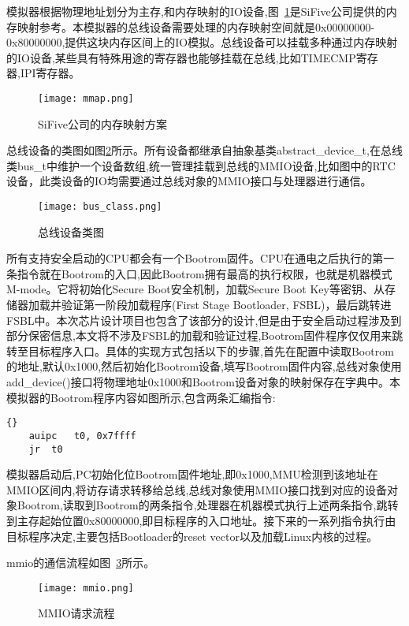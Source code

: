 模拟器根据物理地址划分为主存,和内存映射的IO设备,图~\ref{fig:mmap}是SiFive公司提供的内存映射参考。本模拟器的总线设备需要处理的内存映射空间就是0x00000000-0x80000000,提供这块内存区间上的IO模拟。总线设备可以挂载多种通过内存映射的IO设备,某些具有特殊用途的寄存器也能够挂载在总线,比如TIMECMP寄存器,IPI寄存器。
\begin{figure}[H]
    \centering
    \texttt{[image: mmap.png]}
    \caption{SiFive公司的内存映射方案}
    \label{fig:mmap}
\end{figure}


总线设备的类图如图\ref{fig:bus_class}所示。所有设备都继承自抽象基类abstract\_device\_t,在总线类bus\_t中维护一个设备数组,统一管理挂载到总线的MMIO设备,比如图中的RTC设备，此类设备的IO均需要通过总线对象的MMIO接口与处理器进行通信。
\begin{figure}[H]
    \centering
    \texttt{[image: bus\_class.png]}
    \caption{总线设备类图}
    \label{fig:bus_class}
\end{figure}


所有支持安全启动的CPU都会有一个Bootrom固件。CPU在通电之后执行的第一条指令就在Bootrom的入口,因此Bootrom拥有最高的执行权限，也就是机器模式M-mode。它将初始化Secure Boot安全机制，加载Secure Boot Key等密钥、从存储器加载并验证第一阶段加载程序(First Stage Bootloader, FSBL)，最后跳转进FSBL中。本次芯片设计项目也包含了该部分的设计,但是由于安全启动过程涉及到部分保密信息,本文将不涉及FSBL的加载和验证过程,Bootrom固件程序仅仅用来跳转至目标程序入口。具体的实现方式包括以下的步骤,首先在配置中读取Bootrom的地址,默认0x1000,然后初始化Bootrom设备,填写Bootrom固件内容,总线对象使用add\_device()接口将物理地址0x1000和Bootrom设备对象的映射保存在字典中。本模拟器的Bootrom程序内容如图所示,包含两条汇编指令:
\begin{lstlisting}{}
    auipc	t0, 0x7ffff
    jr 	t0
\end{lstlisting}
模拟器启动后,PC初始化位Bootrom固件地址,即0x1000,MMU检测到该地址在MMIO区间内,将访存请求转移给总线,总线对象使用MMIO接口找到对应的设备对象Bootrom,读取到Bootrom的两条指令,处理器在机器模式执行上述两条指令,跳转到主存起始位置0x80000000,即目标程序的入口地址。接下来的一系列指令执行由目标程序决定,主要包括Bootloader的reset vector以及加载Linux内核的过程。

mmio的通信流程如图~\ref{fig:mmio}所示。
\begin{figure}[H]
    \centering
    \texttt{[image: mmio.png]}
    \caption{MMIO请求流程}
    \label{fig:mmio}
\end{figure}


